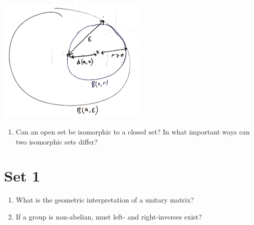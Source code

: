 \documentclass[12pt]{article}
\begin{document}
\begin{enumerate}
\begin{mdframed}
    \includegraphics[width=200pt]{img/questions-oxford-a2-ball-is-open-proof-diagram.png}
  \end{mdframed}
\end{enumerate}

\begin{enumerate}
\item Can an open set be isomorphic to a closed set? In what important ways can two isomorphic sets
  differ?
\end{enumerate}

\section*{Set 1}
\begin{enumerate}
\item What is the geometric interpretation of a unitary matrix?
\item If a group is non-abelian, must left- and right-inverses exist?
\end{enumerate}
\end{document}
